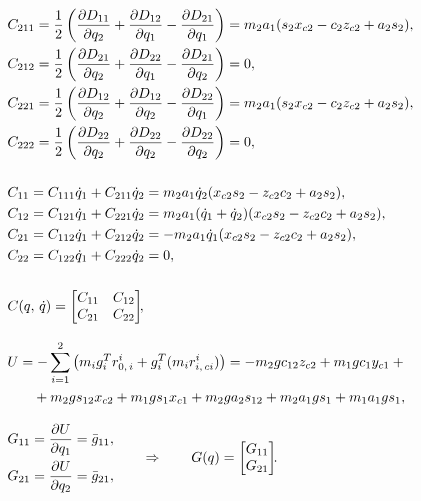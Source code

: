 \begin{align}
    & C_{211} = \frac{1}{2} \left( \frac{\partial D_{11}}{\partial q_2} + \frac{\partial D_{12}}{\partial q_1} - \frac{\partial D_{21}}{\partial q_1} \right) = m_2 a_1 (s_2 x_{c2} - c_2 z_{c2} + a_2 s_2),
    \\
    & C_{212} = \frac{1}{2} \left( \frac{\partial D_{21}}{\partial q_2} + \frac{\partial D_{22}}{\partial q_1} - \frac{\partial D_{21}}{\partial q_2} \right) = 0,
    \\
    & C_{221} = \frac{1}{2} \left( \frac{\partial D_{12}}{\partial q_2} + \frac{\partial D_{12}}{\partial q_2} - \frac{\partial D_{22}}{\partial q_1} \right) = m_2 a_1 (s_2 x_{c2} - c_2 z_{c2} + a_2 s_2),
    \\
    & C_{222} = \frac{1}{2} \left( \frac{\partial D_{22}}{\partial q_2} + \frac{\partial D_{22}}{\partial q_2} - \frac{\partial D_{22}}{\partial q_2} \right) = 0,
    \\[0.5cm]
    & C_{11} = C_{111} \dot{q}_1 + C_{211} \dot{q}_2 = m_2 a_1 \dot{q}_2 ( x_{c2} s_2 - z_{c2}c_2 + a_2 s_2),
    \\
    & C_{12} = C_{121} \dot{q}_1 + C_{221} \dot{q}_2 = m_2 a_1 (\dot{q}_1 + \dot{q}_2) (x_{c2} s_2 - z_{c2} c_2 + a_2 s_2),
    \\
    & C_{21} = C_{112} \dot{q}_1 + C_{212} \dot{q}_2 = -m_2 a_1 \dot{q}_1 ( x_{c2} s_2 - z_{c2}c_2 + a_2 s_2),
    \\
    & C_{22} = C_{122} \dot{q}_1 + C_{222} \dot{q}_2 = 0,
    \\[0.5cm]
    & C(q,\,\dot{q}) =
    \begin{bmatrix}
        C_{11} & C_{12} \\
        C_{21} & C_{22}
    \end{bmatrix}\!\!, \label{eq_second_c_in_first_example}
    \\[0.3cm]
    &U = -\sum_{i=1}^2 \left( m_i g_i^T r^i_{0,\,i} + g_i^T (m_ir^i_{i,\,ci}) \right) = - m_2 g c_{12} z_{c2} + m_1 g c_1 y_{c1} + {}
    \\
    &\phantom{U =} + m_2 g s_{12} x_{c2} + m_1 g s_1 x_{c1} + m_2 g a_2 s_{12} + m_2 a_1 g s_1 + m_1 a_1 g s_1,
    \\[0.3cm]
    &\begin{aligned}
    & G_{11} = \frac{\partial U}{\partial q_1} = \bar{g}_{11},
    \\
    & G_{21} = \frac{\partial U}{\partial q_2} = \bar{g}_{21},
    \end{aligned}
    \qquad \Rightarrow \qquad
    G(q) =
    \begin{bmatrix}
        G_{11} \\ G_{21}
    \end{bmatrix}\!\!\ldotp
\end{align}
